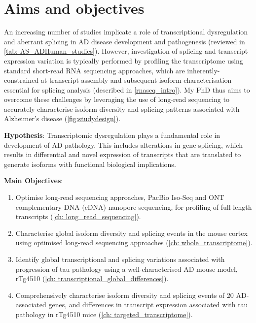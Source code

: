\newpage
\section{Aims and objectives}
An increasing number of studies implicate a role of transcriptional dysregulation and aberrant splicing in AD disease development and pathogenesis (reviewed in \cref{tab: AS_ADHuman_studies}). However, investigation of splicing and transcript expression variation is typically performed by profiling the transcriptome using standard short-read RNA sequencing approaches, which are inherently-constrained at transcript assembly and subsequent isoform characterisation essential for splicing analysis (described in \cref{rnaseq_intro}). My PhD thus aims to overcome these challenges by leveraging the use of long-read sequencing to accurately characterise isoform diversity and splicing patterns associated with Alzheimer's disease (\cref{fig:studydesign}).


\textbf{Hypothesis}: Transcriptomic dysregulation plays a fundamental role in development of AD pathology. This includes alterations in gene splicing, which results in differential and novel expression of transcripts that are translated to generate isoforms with functional biological implications. 

\textbf{Main Objectives}:

\begin{enumerate}[]
	\item Optimise long-read sequencing approaches, PacBio Iso-Seq and ONT complementary DNA (cDNA) nanopore sequencing, for profiling of full-length transcripts (\cref{ch: long_read_sequencing}). 
	\item Characterise global isoform diversity and splicing events in the mouse cortex using optimised long-read sequencing approaches (\cref{ch: whole_transcriptome}). 
	\item Identify global transcriptional and splicing variations associated with progression of tau pathology using a well-characterised AD mouse model, rTg4510 (\cref{ch: transcriptional_global_differences}).
	\item Comprehensively characterise isoform diversity and splicing events of 20 AD-associated genes, and differences in transcript expression associated with tau pathology in rTg4510 mice (\cref{ch: targeted_transcriptome}).
\end{enumerate}


